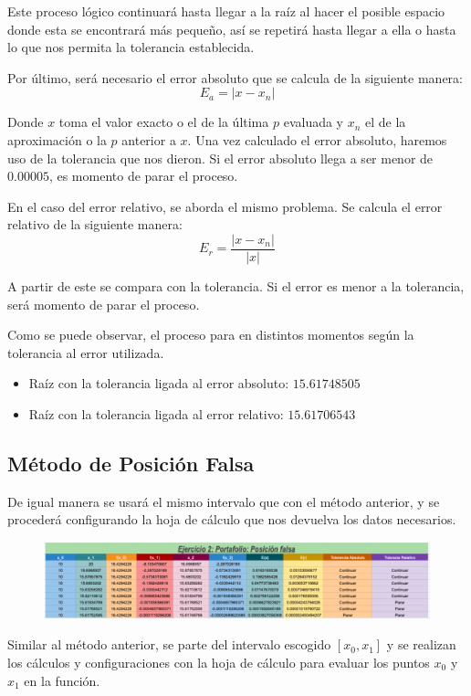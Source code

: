 \documentclass{article}
\begin{document}
Este proceso lógico continuará hasta llegar a la raíz al hacer el posible espacio donde esta se encontrará más pequeño, así se repetirá hasta llegar a ella o hasta lo que nos permita la tolerancia establecida.

Por último, será necesario el error absoluto que se calcula de la siguiente manera:
\[E_a = |x - x_n|\]

Donde \(x\) toma el valor exacto o el de la última \(p\) evaluada y \(x_n\) el de la aproximación o la \(p\) anterior a \(x\). Una vez calculado el error absoluto, haremos uso de la tolerancia que nos dieron. Si el error absoluto llega a ser menor de \(0.00005\), es momento de parar el proceso.

En el caso del error relativo, se aborda el mismo problema. Se calcula el error relativo de la siguiente manera:
\[E_r = \frac{|x - x_n|}{|x|}\]

A partir de este se compara con la tolerancia. Si el error es menor a la tolerancia, será momento de parar el proceso.

Como se puede observar, el proceso para en distintos momentos según la tolerancia al error utilizada.
\begin{itemize}
    \item Raíz con la tolerancia ligada al error absoluto: \(15.61748505\)
    \item Raíz con la tolerancia ligada al error relativo: \(15.61706543\)
\end{itemize}

\subsection{Método de Posición Falsa}
De igual manera se usará el mismo intervalo que con el método anterior, y se procederá configurando la hoja de cálculo que nos devuelva los datos necesarios.
\\
\begin{figure}[h]
    \raggedleft
    \includegraphics[scale=0.3]{Falsa.png}
    \end{figure}

Similar al método anterior, se parte del intervalo escogido \([x_0, x_1]\) y se realizan los cálculos y configuraciones con la hoja de cálculo para evaluar los puntos \(x_0\) y \(x_1\) en la función.
\end{document}
